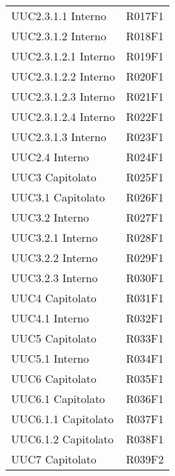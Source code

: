 \documentclass[../analisi-dei-requisiti.tex]{subfiles}
\begin{document}
\begin{longtable}[H]{ p{4cm} | p{4cm} }
  UUC2.3.1.1 Interno            & R017F1                               \\
  UUC2.3.1.2 Interno            & R018F1                               \\
  UUC2.3.1.2.1 Interno          & R019F1                               \\
  UUC2.3.1.2.2 Interno          & R020F1                               \\
  UUC2.3.1.2.3 Interno          & R021F1                               \\
  UUC2.3.1.2.4 Interno          & R022F1                               \\
  UUC2.3.1.3 Interno            & R023F1                               \\
  UUC2.4 Interno                & R024F1                               \\
  UUC3 Capitolato               & R025F1                               \\
  UUC3.1 Capitolato             & R026F1                               \\
  UUC3.2 Interno                & R027F1                               \\
  UUC3.2.1 Interno              & R028F1                               \\
  UUC3.2.2 Interno              & R029F1                               \\
  UUC3.2.3 Interno              & R030F1                               \\
  UUC4 Capitolato               & R031F1                               \\
  UUC4.1 Interno                & R032F1                               \\
  UUC5 Capitolato               & R033F1                               \\
  UUC5.1 Interno                & R034F1                               \\
  UUC6 Capitolato               & R035F1                               \\
  UUC6.1 Capitolato             & R036F1                               \\
  UUC6.1.1 Capitolato           & R037F1                               \\
  UUC6.1.2 Capitolato           & R038F1                               \\
  UUC7 Capitolato               & R039F2                               \\

\end{longtable}
\end{document}
